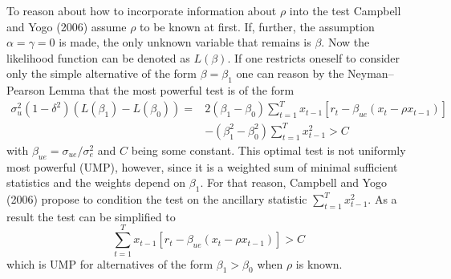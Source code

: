 \documentclass{article}
\begin{document}
To reason about how to incorporate information about $\rho$ into the test Campbell and Yogo (2006) assume $\rho$ to be known at first. If, further, the assumption $\alpha=\gamma=0$ is made, the only unknown variable that remains is $\beta$. Now the likelihood function can be denoted as $L(\beta)$. If one restricts oneself to consider only the simple alternative of the form $\beta=\beta_{1}$ one can reason by the Neyman–Pearson Lemma that the most powerful test is of the form
\begin{equation}
\begin{aligned} \sigma_{u}^{2}\left(1-\delta^{2}\right)\left(L\left(\beta_{1}\right)-L\left(\beta_{0}\right)\right)=& 2\left(\beta_{1}-\beta_{0}\right) \sum_{t=1}^{T} x_{t-1}\left[r_{t}-\beta_{u e}\left(x_{t}-\rho x_{t-1}\right)\right] \\ &-\left(\beta_{1}^{2}-\beta_{0}^{2}\right) \sum_{t=1}^{T} x_{t-1}^{2}>C \end{aligned}
\end{equation}
with $\beta_{u e}=\sigma_{u e} / \sigma_{e}^{2}$ and $C$ being some constant.
This optimal test is not uniformly most powerful (UMP), however, since it is a weighted sum of minimal sufficient statistics and the weights depend on $\beta_{1}$. For that reason, Campbell and Yogo (2006) propose to condition the test on the ancillary statistic  $\sum_{t=1}^{T} x_{t-1}^{2}$. As a result the test can be simplified to
\begin{equation}
 \sum_{t=1}^{T} x_{t-1}\left[r_{t}-\beta_{u e}\left(x_{t}-\rho x_{t-1}\right)\right]>C
\end{equation}
which is UMP for alternatives of the form $\beta_{1}>\beta_{0}$ when $\rho$ is known.
\end{document}
